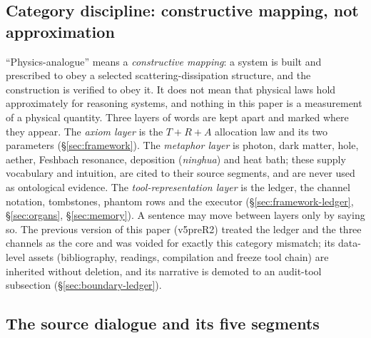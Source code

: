 \documentclass[11pt,a4paper]{article}
\begin{document}
\subsection{Category discipline: constructive mapping, not approximation}
\label{sec:def-category}

``Physics-analogue'' means a \emph{constructive mapping}: a system is built and prescribed to obey a selected scattering-dissipation structure, and the construction is verified to obey it. It does not mean that physical laws hold approximately for reasoning systems, and nothing in this paper is a measurement of a physical quantity. Three layers of words are kept apart and marked where they appear. The \emph{axiom layer} is the $T+R+A$ allocation law and its two parameters (\S\ref{sec:framework}). The \emph{metaphor layer} is photon, dark matter, hole, aether, Feshbach resonance, deposition (\emph{ninghua}) and heat bath; these supply vocabulary and intuition, are cited to their source segments, and are never used as ontological evidence. The \emph{tool-representation layer} is the ledger, the channel notation, tombstones, phantom rows and the executor (\S\ref{sec:framework-ledger}, \S\ref{sec:organs}, \S\ref{sec:memory}). A sentence may move between layers only by saying so. The previous version of this paper (v5preR2) treated the ledger and the three channels as the core and was voided for exactly this category mismatch; its data-level assets (bibliography, readings, compilation and freeze tool chain) are inherited without deletion, and its narrative is demoted to an audit-tool subsection (\S\ref{sec:boundary-ledger}).

\subsection{The source dialogue and its five segments}
\label{sec:def-sources}
\end{document}
